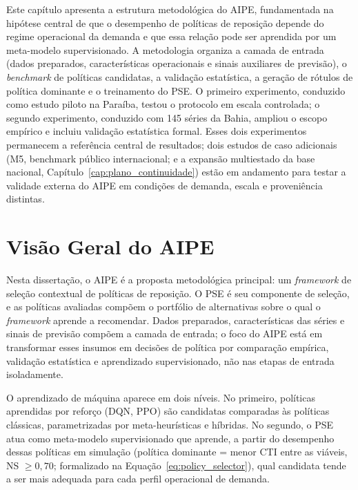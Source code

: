 
Este capítulo apresenta a estrutura metodológica do AIPE, fundamentada na hipótese central de que o desempenho de políticas de reposição depende do regime operacional da demanda e que essa relação pode ser aprendida por um meta-modelo supervisionado. A metodologia organiza a camada de entrada (dados preparados, características operacionais e sinais auxiliares de previsão), o \textit{benchmark} de políticas candidatas, a validação estatística, a geração de rótulos de política dominante e o treinamento do PSE. O primeiro experimento, conduzido como estudo piloto na Paraíba, testou o protocolo em escala controlada; o segundo experimento, conduzido com 145 séries da Bahia, ampliou o escopo empírico e incluiu validação estatística formal. Esses dois experimentos permanecem a referência central de resultados; dois estudos de caso adicionais (M5, benchmark público internacional; e a expansão multiestado da base nacional, Capítulo~\ref{cap:plano_continuidade}) estão em andamento para testar a validade externa do AIPE em condições de demanda, escala e proveniência distintas.
\section{Visão Geral do AIPE}
\label{sec:visao_geral_aipe}

Nesta dissertação, o AIPE é a proposta metodológica principal: um \textit{framework} de seleção contextual de políticas de reposição. O PSE é seu componente de seleção, e as políticas avaliadas compõem o portfólio de alternativas sobre o qual o \textit{framework} aprende a recomendar. Dados preparados, características das séries e sinais de previsão compõem a camada de entrada; o foco do AIPE está em transformar esses insumos em decisões de política por comparação empírica, validação estatística e aprendizado supervisionado, não nas etapas de entrada isoladamente.

O aprendizado de máquina aparece em dois níveis. No primeiro, políticas aprendidas por reforço (DQN, PPO) são candidatas comparadas às políticas clássicas, parametrizadas por meta-heurísticas e híbridas. No segundo, o PSE atua como meta-modelo supervisionado que aprende, a partir do desempenho dessas políticas em simulação (política dominante = menor CTI entre as viáveis, NS $\geq 0{,}70$; formalizado na Equação~\ref{eq:policy_selector}), qual candidata tende a ser mais adequada para cada perfil operacional de demanda.

